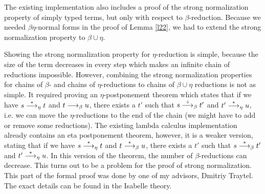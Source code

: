The existing implementation also includes a proof of the strong normalization property of simply typed terms, but only with respect to $\beta$-reduction. Because we needed $\beta\eta$-normal forms in the proof of Lemma \ref{l22}, we had to extend the strong normalization property to $\beta \cup \eta$.

Showing the strong normalization property for $\eta$-reduction is simple, because the size of  the term decreases in every step which makes an infinite chain of reductions impossible. However, combining the strong normalization properties for chains of $\beta$- and chains of $\eta$-reductions to chains of $\beta \cup \eta$ reductions is not as simple. It required proving an $\eta$-postponement theorem which states that if we have $s \overset{*}{\longrightarrow}_\eta t$ and $t \longrightarrow_\beta u$, there exists a $t'$ such that $s \overset{+}{\longrightarrow}_\beta t'$ and $t' \overset{*}{\longrightarrow}_\eta u$, i.e. we can move the $\eta$-reductions to the end of the chain (we might have to add or remove some reductions). The existing lambda calculus implementation already contains an eta postponement theorem, however, it is a weaker version, stating that if we have $s \overset{*}{\longrightarrow}_\eta t$ and $t \overset{*}{\longrightarrow}_\beta u$, there exists a $t'$ such that $s \overset{*}{\longrightarrow}_\beta t'$ and $t' \overset{*}{\longrightarrow}_\eta u$. In this version of the theorem, the number of $\beta$-reductions can decrease. This turns out to be a problem for the proof of strong normalization. This part of the formal proof was done by one of my advisors, Dmitriy Traytel. The exact details can be found in the Isabelle theory.